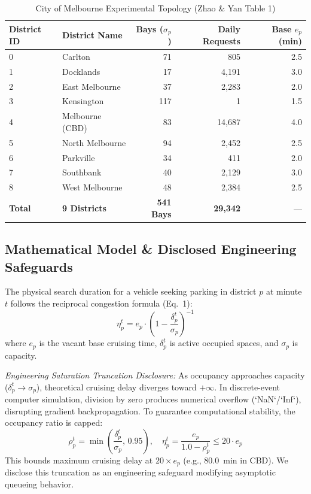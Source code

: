 \documentclass[journal]{IEEEtran}
\begin{document}
\begin{table}[t]
\caption{City of Melbourne Experimental Topology (Zhao \& Yan Table 1)}
\label{tab:melbourne_spec}
\centering
\begin{tabular}{llrrr}
\toprule
\textbf{District ID} & \textbf{District Name} & \textbf{Bays ($\sigma_p$)} & \textbf{Daily Requests} & \textbf{Base $e_p$ (min)} \\
\midrule
0 & Carlton & 71 & 805 & 2.5 \\
1 & Docklands & 17 & 4,191 & 3.0 \\
2 & East Melbourne & 37 & 2,283 & 2.0 \\
3 & Kensington & 117 & 1 & 1.5 \\
4 & Melbourne (CBD) & 83 & 14,687 & 4.0 \\
5 & North Melbourne & 94 & 2,452 & 2.5 \\
6 & Parkville & 34 & 411 & 2.0 \\
7 & Southbank & 40 & 2,129 & 3.0 \\
8 & West Melbourne & 48 & 2,384 & 2.5 \\
\midrule
\textbf{Total} & \textbf{9 Districts} & \textbf{541 Bays} & \textbf{29,342} & --- \\
\bottomrule
\end{tabular}
\end{table}

\subsection{Mathematical Model & Disclosed Engineering Safeguards}
The physical search duration for a vehicle seeking parking in district $p$ at minute $t$ follows the reciprocal congestion formula (Eq.~1):
\begin{equation}
\eta_p^t = e_p \cdot \left(1 - \frac{\delta_p^t}{\sigma_p}\right)^{-1}
\end{equation}
where $e_p$ is the vacant base cruising time, $\delta_p^t$ is active occupied spaces, and $\sigma_p$ is capacity.

\textit{Engineering Saturation Truncation Disclosure:} As occupancy approaches capacity ($\delta_p^t \to \sigma_p$), theoretical cruising delay diverges toward $+\infty$. In discrete-event computer simulation, division by zero produces numerical overflow (`NaN`/`Inf`), disrupting gradient backpropagation. To guarantee computational stability, the occupancy ratio is capped:
\begin{equation}
\rho_p^t = \min\left(\frac{\delta_p^t}{\sigma_p}, \, 0.95\right), \quad \eta_p^t = \frac{e_p}{1.0 - \rho_p^t} \le 20 \cdot e_p
\end{equation}
This bounds maximum cruising delay at $20 \times e_p$ (e.g., 80.0~min in CBD). We disclose this truncation as an engineering safeguard modifying asymptotic queueing behavior.
\end{document}
